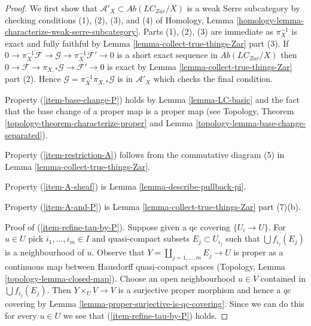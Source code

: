 \begin{proof}
We first show that $\mathcal{A}'_X \subset \textit{Ab}(\textit{LC}_{Zar}/X)$
is a weak Serre subcategory by checking conditions (1), (2), (3), and (4)
of Homology, Lemma \ref{homology-lemma-characterize-weak-serre-subcategory}.
Parts (1), (2), (3) are immediate as $\pi_X^{-1}$ is exact and
fully faithful by Lemma \ref{lemma-collect-true-things-Zar} part (3). If
$0 \to \pi_X^{-1}\mathcal{F} \to \mathcal{G} \to \pi_X^{-1}\mathcal{F}' \to 0$
is a short exact sequence in $\textit{Ab}(\textit{LC}_{Zar}/X)$
then $0 \to \mathcal{F} \to \pi_{X, *}\mathcal{G} \to \mathcal{F}' \to 0$
is exact by Lemma \ref{lemma-collect-true-things-Zar} part (2).
Hence $\mathcal{G} = \pi_X^{-1}\pi_{X, *}\mathcal{G}$ is in
$\mathcal{A}'_X$ which checks the final condition.

\medskip\noindent
Property (\ref{item-base-change-P}) holds by Lemma \ref{lemma-LC-basic}
and the fact that the base change of a proper map is a proper map (see
Topology, Theorem \ref{topology-theorem-characterize-proper} and
Lemma \ref{topology-lemma-base-change-separated}).

\medskip\noindent
Property (\ref{item-restriction-A}) follows from the commutative
diagram (5) in Lemma \ref{lemma-collect-true-things-Zar}.

\medskip\noindent
Property (\ref{item-A-sheaf}) is Lemma \ref{lemma-describe-pullback-pi}.

\medskip\noindent
Property (\ref{item-A-and-P}) is Lemma \ref{lemma-collect-true-things-Zar}
part (7)(b).

\medskip\noindent
Proof of (\ref{item-refine-tau-by-P}). Suppose given a qc covering
$\{U_i \to U\}$. For $u \in U$ pick $i_1, \ldots, i_m \in I$ and
quasi-compact subsets $E_j \subset U_{i_j}$ such that
$\bigcup f_{i_j}(E_j)$ is a neighbourhood of $u$.
Observe that $Y = \coprod_{j = 1, \ldots, m} E_j \to U$
is proper as a continuous map between Hausdorff quasi-compact spaces
(Topology, Lemma \ref{topology-lemma-closed-map}).
Choose an open neighbourhood $u \in V$ contained in $\bigcup f_{i_j}(E_j)$.
Then $Y \times_U V \to V$ is a surjective proper morphism and
hence a $qc$ covering by Lemma \ref{lemma-proper-surjective-is-qc-covering}.
Since we can do this for every $u \in U$ we see that
(\ref{item-refine-tau-by-P}) holds.
\end{proof}

